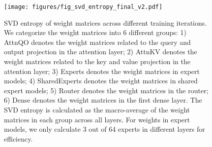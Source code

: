 \begin{figure}[t]
    \centering
    \texttt{[image: figures/fig\_svd\_entropy\_final\_v2.pdf]}
    \caption{SVD entropy of weight matrices across different training iterations. We categorize the weight matrices into 6 different groups: 1) AttnQO denotes the weight matrices related to the query and output projection in the attention layer; 2) AttnKV denotes the weight matrices related to the key and value projection in the attention layer; 3) Experts denotes the weight matrices in expert models; 4) SharedExperts denotes the weight matrices in shared expert models; 5) Router denotes the weight matrices in the router; 6) Dense denotes the weight matrices in the first dense layer. The SVD entropy is calculated as the macro-average of the weight matrices in each group across all layers. For weights in expert models, we only calculate 3 out of 64 experts in different layers for efficiency.} 
    \label{fig_svd_entropy} 
\end{figure}